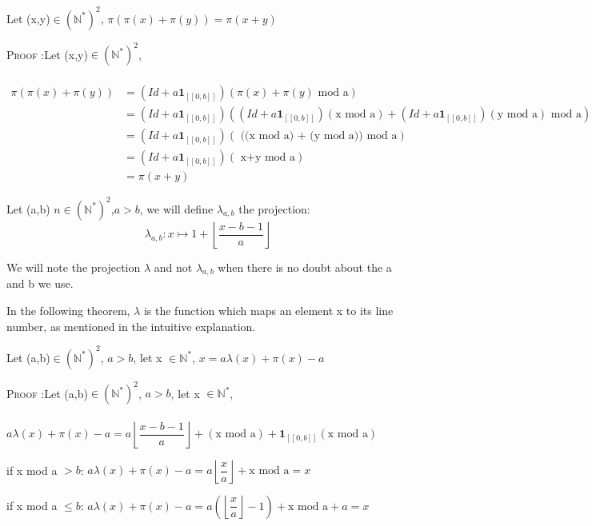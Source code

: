 \begin{proposition}
Let (x,y)\(\in (\mathbb{N}^*)^2\), \(\pi(\pi(x)+\pi(y))=\pi(x+y)\)
\end{proposition}

\textsc{Proof :}Let (x,y)\(\in (\mathbb{N}^*)^2\),

\begin{align*}
 \\\pi(\pi(x)+\pi(y)) & = (Id+a\mathbf{1}_{ [\![0,b]\!]})(\pi(x)+\pi(y)\text{ mod a})\\
& = (Id+a\mathbf{1}_{ [\![0,b]\!]})((Id+a\mathbf{1}_{ [\![0,b]\!]})(\text{x mod a})+(Id+a\mathbf{1}_{ [\![0,b]\!]})(\text{y mod a})\text{ mod a}) \\
& = (Id+a\mathbf{1}_{ [\![0,b]\!]})(\text{ ((x mod a) + (y mod a)) mod a})\\
& =(Id+a\mathbf{1}_{ [\![0,b]\!]})(\text{ x+y mod a})\\
& =\pi(x+y)
\end{align*}


\begin{definition}

Let (a,b) \(n \in (\mathbb{N}^*)^2\),\(a>b\), we will define \(\lambda_{a,b}\) the projection:
\[ \lambda_{a,b}:x \longmapsto 1+ \left\lfloor\dfrac{x-b-1}{a}\right\rfloor\]
\end{definition}

We will note  the projection \(\lambda\) and not \(\lambda_{a,b}\) when there is no doubt about the a and b we use.

\begin{remark}
In the following theorem, \(\lambda\) is the function which maps an element x to its line number, as mentioned in the intuitive explanation.
\end{remark}

\begin{proposition}
Let (a,b)\(\in (\mathbb{N}^*)^2\), \(a>b\), let x \(\in \mathbb{N}^*\), \(x=a\lambda(x)+\pi(x)-a\)
\end{proposition}
\textsc{Proof :}Let (a,b)\(\in (\mathbb{N}^*)^2\), \(a>b\), let x \(\in \mathbb{N}^*\),
\\\\ \(a\lambda(x)+\pi(x)-a=a\left\lfloor\dfrac{x-b-1}{a}\right\rfloor+(\text{x mod a})+\mathbf{1}_{ [\![0,b]\!]}(\text{x mod a})\)

if x mod a \(>b\): \(a\lambda(x)+\pi(x)-a=a\left\lfloor\dfrac{x}{a}\right\rfloor+\text{x mod a}=x\)

if x mod a \(\leqslant b\):
\(a\lambda(x)+\pi(x)-a=a(\left\lfloor\dfrac{x}{a}\right\rfloor-1)+\text{x mod a}+a=x\)


